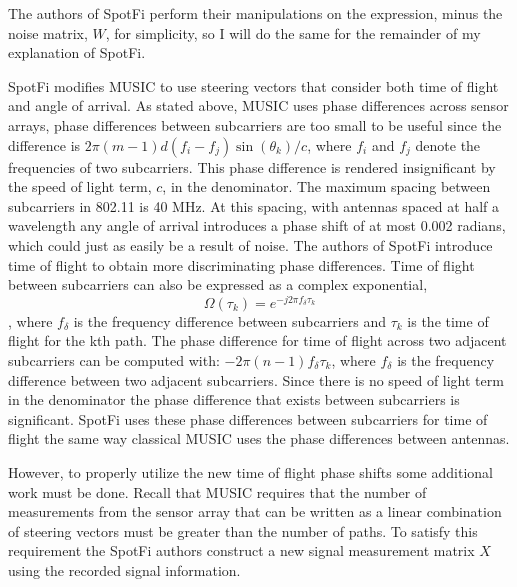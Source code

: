\documentclass[12pt]{report}
\begin{document}
The authors of SpotFi perform their manipulations on the expression, minus the noise matrix, $W$, for simplicity, so I will do the same for the remainder of my explanation of SpotFi. \par

SpotFi modifies MUSIC to use steering vectors that consider both time of flight and angle of arrival. As stated above, MUSIC uses phase differences across sensor arrays, phase differences between subcarriers are too small to be useful since the difference is $2 \pi (m - 1) d (f_i - f_j) \sin(\theta_k) / c$, where $f_i$ and $f_j$ denote the frequencies of two subcarriers. This phase difference is rendered insignificant by the speed of light term, $c$, in the denominator. The maximum spacing between subcarriers in 802.11 is 40 MHz. At this spacing, with antennas spaced at half a wavelength any angle of arrival introduces a phase shift of at most 0.002 radians, which could just as easily be a result of noise. The authors of SpotFi introduce time of flight to obtain more discriminating phase differences. Time of flight between subcarriers can also be expressed as a complex exponential, $$\Omega(\tau_{k}) = e^{-j 2 \pi f_{\delta} \tau_k }$$, where $f_{\delta}$ is the frequency difference between subcarriers and $\tau_{k}$ is the time of flight for the kth path. The phase difference for time of flight across two adjacent subcarriers can be computed with: $-2 \pi (n - 1) f_{\delta} \tau_k$, where $f_{\delta}$ is the frequency difference between two adjacent subcarriers. Since there is no speed of light term in the denominator the phase difference that exists between subcarriers is significant. SpotFi uses these phase differences between subcarriers for time of flight the same way classical MUSIC uses the phase differences between antennas. \par

However, to properly utilize the new time of flight phase shifts some additional work must be done. Recall that MUSIC requires that the number of measurements from the sensor array that can be written as a linear combination of steering vectors must be greater than the number of paths. To satisfy this requirement the SpotFi authors construct a new signal measurement matrix $X$ using the recorded signal information. \par
\end{document}
